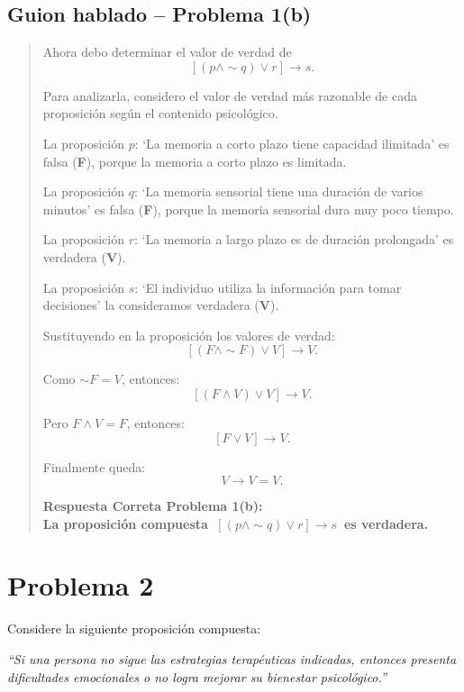 \documentclass[12pt]{article}
\begin{document}
	
	\subsection*{Guion hablado -- Problema 1(b)}
	
	\begin{quote}
		Ahora debo determinar el valor de verdad de
		\[
		[(p\land \sim q)\lor r]\to s.
		\]
		
		Para analizarla, considero el valor de verdad más razonable de cada proposición según el contenido psicológico.
		
		La proposición \(p\): ‘La memoria a corto plazo tiene capacidad ilimitada’ es falsa (\textbf{F}), porque la memoria a corto plazo es limitada.
		
		La proposición \(q\): ‘La memoria sensorial tiene una duración de varios minutos’ es falsa (\textbf{F}), porque la memoria sensorial dura muy poco tiempo.
		
		La proposición \(r\): ‘La memoria a largo plazo es de duración prolongada’ es verdadera (\textbf{V}).
		
		La proposición \(s\): ‘El individuo utiliza la información para tomar decisiones’ la consideramos verdadera (\textbf{V}).
		
		Sustituyendo en la proposición los valores de verdad: 
		\[
		[(F\land \sim F)\lor V]\to V.
		\]
		
		Como \(\sim F = V\), entonces:
		\[
		[(F\land V)\lor V]\to V.
		\]
		
		Pero \(F\land V = F\), entonces:
		\[
		[F\lor V]\to V.
		\]
		
		Finalmente queda:
		\[
		V\to V = V.
		\]
		
		\textbf{Respuesta Correta Problema 1(b):\\
			La proposición compuesta $\ [(p\land \sim q)\lor r]\to s$\  es verdadera.}
		\end{quote}
	
\newpage
	
	\section*{Problema 2}
	
	Considere la siguiente proposición compuesta:
	
	\textit{“Si una persona no sigue las estrategias terapéuticas indicadas, entonces presenta dificultades emocionales o no logra mejorar su bienestar psicológico.”}
	
\end{document}
